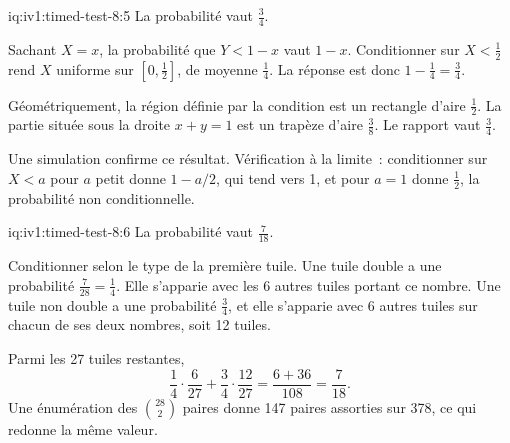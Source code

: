 \begin{solution}{iq:iv1:timed-test-8:5}
La probabilité vaut $\frac34$.

Sachant $X = x$, la probabilité que $Y < 1 - x$ vaut $1 - x$. Conditionner sur $X < \frac12$ rend $X$ uniforme sur $[0, \frac12]$, de moyenne $\frac14$. La réponse est donc $1 - \frac14 = \frac34$.

Géométriquement, la région définie par la condition est un rectangle d'aire $\frac12$. La partie située sous la droite $x + y = 1$ est un trapèze d'aire $\frac38$. Le rapport vaut $\frac34$.

Une simulation confirme ce résultat. Vérification à la limite~: conditionner sur $X < a$ pour $a$ petit donne $1 - a/2$, qui tend vers 1, et pour $a = 1$ donne $\frac12$, la probabilité non conditionnelle.

\end{solution}

\begin{solution}{iq:iv1:timed-test-8:6}
La probabilité vaut $\frac{7}{18}$.

Conditionner selon le type de la première tuile. Une tuile double a une probabilité $\frac{7}{28} = \frac14$. Elle s'apparie avec les 6 autres tuiles portant ce nombre. Une tuile non double a une probabilité $\frac34$, et elle s'apparie avec 6 autres tuiles sur chacun de ses deux nombres, soit 12 tuiles.

Parmi les 27 tuiles restantes,
\[
\frac14 \cdot \frac{6}{27} + \frac34 \cdot \frac{12}{27} = \frac{6 + 36}{108} = \frac{7}{18}.
\]
Une énumération des $\binom{28}{2}$ paires donne 147 paires assorties sur 378, ce qui redonne la même valeur.

\end{solution}


